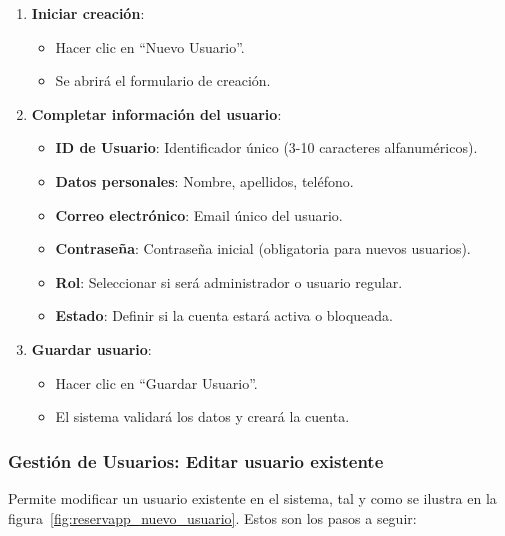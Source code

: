 \begin{enumerate}
   \item \textbf{Iniciar creación}:
   \begin{itemize}
      \item Hacer clic en ``Nuevo Usuario''.
      \item Se abrirá el formulario de creación.
   \end{itemize}
   \item \textbf{Completar información del usuario}:
   \begin{itemize}
      \item \textbf{ID de Usuario}: Identificador único (3-10 caracteres alfanuméricos).
      \item \textbf{Datos personales}: Nombre, apellidos, teléfono.
	  \item \textbf{Correo electrónico}: Email único del usuario.
	  \item \textbf{Contraseña}: Contraseña inicial (obligatoria para nuevos usuarios).
	  \item \textbf{Rol}: Seleccionar si será administrador o usuario regular.
	  \item \textbf{Estado}: Definir si la cuenta estará activa o bloqueada.
   \end{itemize}
   \item \textbf{Guardar usuario}:
   \begin{itemize}
      \item Hacer clic en ``Guardar Usuario''.
	  \item El sistema validará los datos y creará la cuenta.
   \end{itemize}
\end{enumerate}

\subsubsection{Gestión de Usuarios: Editar usuario existente}
Permite modificar un usuario existente en el sistema, tal y como se ilustra en la figura~\ref{fig:reservapp_nuevo_usuario}. Estos son los pasos a seguir:

